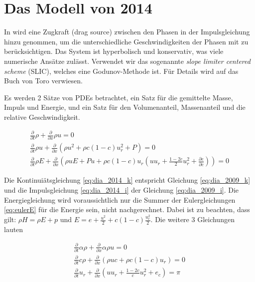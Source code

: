 \section{Das Modell von 2014}

In \cite{dia_2014_ijnmf} wird eine Zugkraft
(drag source) zwischen den Phasen in der Impulsgleichung hinzu
genommen, um die unterschiedliche Geschwindigkeiten der Phasen mit zu
berücksichtigen. Das System ist hyperbolisch und konservativ, was
viele numerische Ansätze zulässt. Verwendet wir das sogenannte {\it
  slope limiter centered scheme} (SLIC), welches eine Godunov-Methode
ist. Für Details wird auf das Buch von Toro verwiesen.

Es werden 2 Sätze von PDEs betrachtet, ein Satz für die gemittelte
Masse, Impuls und Energie, und ein Satz für den Volumenanteil,
Massenanteil und die relative Geschwindigkeit.

\begin{eqnarray}
&\frac{\partial}{\partial t}\rho + \frac{\partial}{\partial x} \rho u
=  0\label{eq:dia_2014_k}&\\[2mm]
&\frac{\partial}{\partial t} \rho u + \frac{\partial}{\partial x} \left(
\rho u^2 + \rho c (1-c) u_r^2 + P\right) = 0 \label{eq:dia_2014_i}&\\[2mm]
&\frac{\partial}{\partial t} \rho E + \frac{\partial}{\partial x}
\left( \rho u E + Pu + \rho c (1-c) u_r \left(uu_r + \frac{1-2c}{2}
u_r^2 + \frac{\partial e}{\partial c} \right)\right) = 0&\label{eq:dia_2014_e}
\end{eqnarray}

Die Kontinuiätsgleichung \ref{eq:dia_2014_k} entspricht Gleichung
\ref{eq:dia_2009_k} und die Impulsgleichung \ref{eq:dia_2014_i} der
Gleichung \ref{eq:dia_2009_i}. Die Energiegleichung wird
voraussichtlich nur die Summer der Eulergleichungen \ref{eq:eulerE}
für die Energie sein, nicht nachgerechnet. Dabei ist zu beachten, dass
gilt: $\rho H = \rho E+p$ und $E = e + \frac{u^2}{2} +
c(1-c)\frac{u_r^2}{2}$. Die weitere 3 Gleichungen lauten

\begin{eqnarray}
&\frac{\partial}{\partial t}\alpha\rho + \frac{\partial}{\partial x}
  \alpha\rho u = 0\label{eq:dia_2014_k1}&\\[2mm]
&\frac{\partial}{\partial t}c\rho + \frac{\partial}{\partial x}
  \left(\rho u c + \rho c (1-c) u_r \right) =
    0\label{eq:dia_2014_c1}&\\[2mm]
&\frac{\partial}{\partial t} u_r + \frac{\partial}{\partial x} (
uu_r + \frac{1-2c}{c} u_r^2 + e_c) = \pi& \label{eq:dia_2014_r}
\end{eqnarray}

